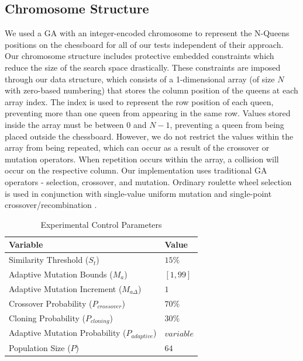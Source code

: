 \documentclass[conference]{IEEEtran}
\begin{document}
\subsection{Chromosome Structure}
\label{section:chromosomestruct}
We used a GA with an integer-encoded chromosome to represent the N-Queens positions on the chessboard for all of our tests independent of their approach. Our chromosome structure includes protective embedded constraints which reduce the size of the search space drastically. These constraints are imposed through our data structure, which consists of a 1-dimensional array (of size $N$ with zero-based numbering) that stores the column position of the queens at each array index. The index is used to represent the row position of each queen, preventing more than one queen from appearing in the same row. Values stored inside the array must be between 0 and $N - 1$, preventing a queen from being placed outside the chessboard. However, we do not restrict the values within the array from being repeated, which can occur as a result of the crossover or mutation operators. When repetition occurs within the array, a collision will occur on the respective column. Our implementation uses traditional GA operators - selection, crossover, and mutation. Ordinary roulette wheel selection \cite{cit:19} is used in conjunction with single-value uniform mutation and single-point crossover/recombination \cite{cit:16}. 

\begin{table}
\centering
\caption{Experimental Control Parameters}
\begin{tabular}{|l|l|} \hline
Variable&                                         Value \\ \hline
Similarity Threshold ($S_{t}$)&                   $15\%$ \\ \hline
Adaptive Mutation Bounds ($M_{a}$)&               $[1, 99]$ \\ \hline   
Adaptive Mutation Increment ($M_{a\Delta}$)&      $1$ \\ \hline
Crossover Probability ($P_{crossover}$)&          $70\%$ \\ \hline
Cloning Probability ($P_{cloning}$)&              $30\%$ \\ \hline
Adaptive Mutation Probability ($P_{adaptive}$)&   $variable$ \\ \hline
Population Size ($P$)&                            $64$ \\ \hline
\end{tabular}
\label{table:geneticoperators}
\end{table}
\end{document}

